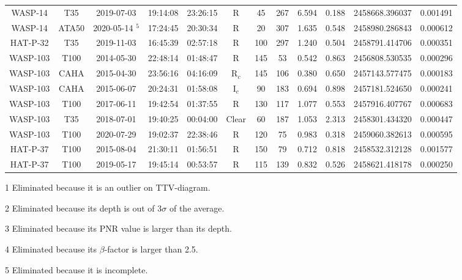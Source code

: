 \documentclass[a4paper,fleqn,usenatbib]{mnras}
\begin{document}
\begin{table*}
\begin{threeparttable}
\begin{tabular}{cccccccccccc}
                WASP-14 & T35 & 2019-07-03 & 19:14:08 & 23:26:15 & R & 45 & 267 & 6.594 & 0.188 & 2458668.396037 & 0.001491 \\
                WASP-14 & ATA50 & 2020-05-14 $^5$ & 17:24:45 & 20:30:34 & R & 20 & 307 & 1.635 & 0.548 & 2458980.286843 & 0.000612 \\
                HAT-P-32 & T35 & 2019-11-03 & 16:45:39 & 02:57:18 & R & 100 & 297 & 1.240 & 0.504 & 2458791.414706 & 0.000351 \\
                WASP-103 & T100 & 2014-05-30 & 22:48:14 & 01:48:47 & R & 145 & 53 & 0.542 & 0.863 & 2456808.530535 & 0.000296 \\
                WASP-103 & CAHA & 2015-04-30 & 23:56:16 & 04:16:09 & R$_{c}$ & 145 & 106 & 0.380 & 0.650 & 2457143.577475 & 0.000183 \\
                WASP-103 & CAHA & 2015-06-07 & 20:24:31 & 01:58:08 & I$_{c}$ & 90 & 183 & 0.694 & 0.898 & 2457181.524650 & 0.000241 \\
                WASP-103 & T100 & 2017-06-11 & 19:42:54 & 01:37:55 & R & 130 & 117 & 1.077 & 0.553 & 2457916.407767 & 0.000683 \\
                WASP-103 & T35 & 2018-07-01 & 19:40:25 & 00:04:00 & Clear & 60 & 187 & 1.053 & 2.313 & 2458301.434320 & 0.000447 \\
                WASP-103 & T100 & 2020-07-29 & 19:02:37 & 22:38:46 & R & 120 & 75 & 0.983 & 0.318 & 2459060.382613 & 0.000595 \\
                HAT-P-37 & T100 & 2015-08-04 & 21:30:11 & 01:56:51 & R & 150 & 79 & 0.712 & 0.818 & 2458532.312128 & 0.001577 \\
                HAT-P-37 & T100 & 2019-05-17 & 19:45:14 & 00:53:57 & R & 115 & 139 & 0.832 & 0.526 & 2458621.418178 & 0.000250 \\
		\hline
        \end{tabular}
        \begin{tablenotes}
          \scriptsize{
          \item[1] Eliminated because it is an outlier on TTV-diagram.
          \item[2] Eliminated because its depth is out of 3$\sigma$ of the average.
          \item[3] Eliminated because its PNR value is larger than its depth.
          
          \item[4] Eliminated because its $\beta$-factor is larger than 2.5.
          \item[5] Eliminated because it is incomplete.
          }
        \end{tablenotes}
        \end{threeparttable}
\end{table*}
\end{document}
